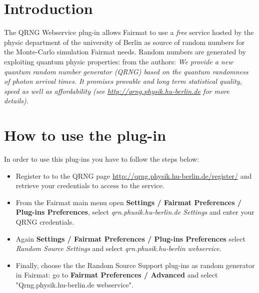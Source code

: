 
\newcommand{\pluginName}{QRNG Webservice}
\newcommand{\pluginVersion}{1.0}





\PluginTitle{\pluginName}{\pluginVersion}

\section{Introduction}

The QRNG Webservice plug-in allows Fairmat to use a \emph{free} service hosted by the physic department of the university of Berlin as source of random numbers for the Monte-Carlo simulation Fairmat needs. 
Random numbers are generated by exploiting quantum physic properties: from the authors: \emph{We provide a new quantum random number generator (QRNG) based on the quantum randomness of photon arrival times. It promises provable and long term statistical quality, speed as well as affordability (see \url{http://qrng.physik.hu-berlin.de} for more details).}


\section{How to use the plug-in}

In order to use this plug-ins you have to follow the steps below:
\begin{itemize}

\item Register to to the QRNG page \url{http://qrng.physik.hu-berlin.de/register/} and retrieve your credentials to access to the service.
\item From the Fairmat main menu open \textbf{Settings / Fairmat Preferences / Plug-ins Preferences}, select \emph{qrn.phusik.hu-berlin.de Settings} and enter your QRNG credentials.
\item Again \textbf{Settings / Fairmat Preferences / Plug-ins Preferences} select \emph{Random Source Settings} and select \emph{qrn.phusik.hu-berlin webservice}.
\item Finally, choose the  the Random Source Support plug-ins as random generator in Fairmat: go to \textbf{Fairmat Preferences / Advanced} and select "Qrng.physik.hu-berlin.de webservice".
\end{itemize}





